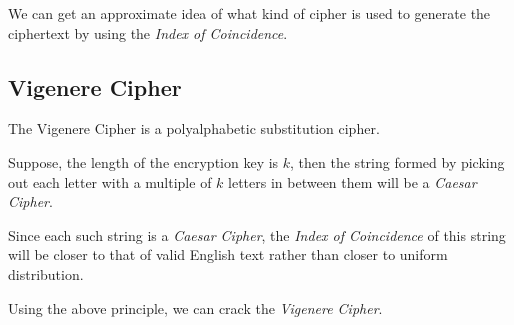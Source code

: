 \documentclass[10pt,twoside]{article}
\begin{document}
We can get an approximate idea of what kind of cipher is used to generate the ciphertext by using the \textit{Index of Coincidence}.

\subsection{Vigenere Cipher} \label{vc}
The Vigenere Cipher is a polyalphabetic substitution cipher. \newline

Suppose, the length of the encryption key is $k$, then the string formed by picking out each letter with a multiple of $k$ letters in between them will be a \textit{Caesar Cipher}. \newline

Since each such string is a \textit{Caesar Cipher}, the \textit{Index of Coincidence} of this string will be closer to that of valid English text rather than closer to uniform distribution. \newline

Using the above principle, we can crack the \textit{Vigenere Cipher}.
\end{document}

